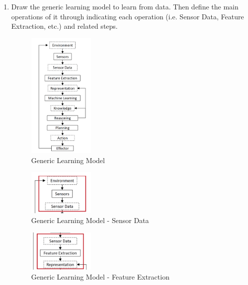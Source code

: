 \documentclass[12pt]{article}
\newenvironment{QandA}{\begin{enumerate}[label=\bfseries\arabic*.]\bfseries}
{\end{enumerate}}
\newenvironment{answered}{\par\normalfont\color{Sepia}}{}
\begin{document}
\begin{QandA}
    \item Draw the generic learning model to learn from data. Then define the main operations of
          it through indicating each operation (i.e. Sensor Data, Feature Extraction, etc.) and
          related steps.
    \begin{answered}
        \begin{figure}[H]
            \centering
            \includegraphics[width=0.3\textwidth]{generic_learning_model.png}
            \caption{Generic Learning Model}
            \label{fig:generic}
        \end{figure}

        \begin{figure}[H]
            \centering
            \includegraphics[width=0.3\textwidth]{sensor_data.png}
            \caption{Generic Learning Model - Sensor Data}
            \label{fig:sensor}
        \end{figure}

        \begin{figure}[H]
            \centering
            \includegraphics[width=0.3\textwidth]{feature_extraction.png}
            \caption{Generic Learning Model - Feature Extraction}
            \label{fig:feature}
        \end{figure}


\end{answered}
\end{QandA}
\end{document}
